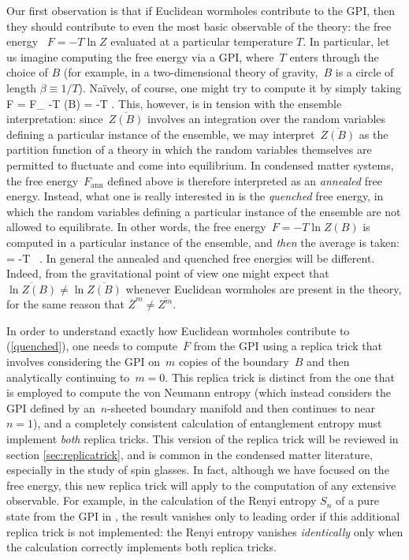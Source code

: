 \documentclass[12pt]{article}
\begin{document}
Our first observation is that if Euclidean wormholes contribute to the GPI, then they should contribute to even the most basic observable of the theory: the free energy ~$F = - T \ln Z$ evaluated at a particular temperature $T$.  In particular, let us imagine computing the free energy via a GPI, where~$T$ enters through the choice of $B$ (for example, in a two-dimensional theory of gravity,~$B$ is a circle of length $\beta \equiv 1/T$).  Na\"ively, of course, one might try to compute it by simply taking
\be
F = F_ \equiv -T \ln \Pcal(B) = -T \ln {}.
\label{annealed}
\ee
This, however, is in tension with the ensemble interpretation: since~$\overline{Z(B)}$ involves an integration over the random variables defining a particular instance of the ensemble, we may interpret~$\overline{Z(B)}$ as the partition function of a theory in which the random variables themselves are permitted to fluctuate and come into equilibrium.  In condensed matter systems, the free energy~$F_\mathrm{ann}$ defined above is therefore interpreted as an \textit{annealed} free energy.  Instead, what one is really interested in is the \textit{quenched} free energy, in which the random variables defining a particular instance of the ensemble are not allowed to equilibrate.  In other words, the free energy~$F = -T \ln Z(B)$ is computed in a particular instance of the ensemble, and \textit{then} the average is taken:
\be
{} = -T \, .
\label{quenched}
\ee
In general the annealed and quenched free energies will be different.  Indeed, from the gravitational point of view one might expect that $\overline{\ln Z(B)} \ne \ln {\overline{Z(B)}}$ whenever Euclidean wormholes are present in the theory, for the same reason that $\overline{Z}^m \ne \overline{Z^m}$.

In order to understand exactly how Euclidean wormholes contribute to (\ref{quenched}), one needs to compute~$\overline{F}$ from the GPI using a replica trick that involves considering the GPI on~$m$ copies of the boundary~$B$ and then analytically continuing to~$m = 0$.  This replica trick is distinct from the one that is employed to compute the von Neumann entropy (which instead considers the GPI defined by an~$n$-sheeted boundary manifold and then continues to near~$n = 1$), and a completely consistent calculation of entanglement entropy must implement \textit{both} replica tricks.  This version of the replica trick will be reviewed in section \ref{sec:replicatrick}, and is common in the condensed matter literature, especially in the study of spin glasses.
In fact, although we have focused on the free energy, this new replica trick will apply to the computation of any extensive observable.  For example, in the calculation of the Renyi entropy $S_{n}$ of a pure state from the GPI in \cite{AlmHar19}, the result vanishes only to leading order if this additional replica trick is not implemented: the Renyi entropy vanishes \textit{identically} only when the calculation correctly implements both replica tricks.
\end{document}
